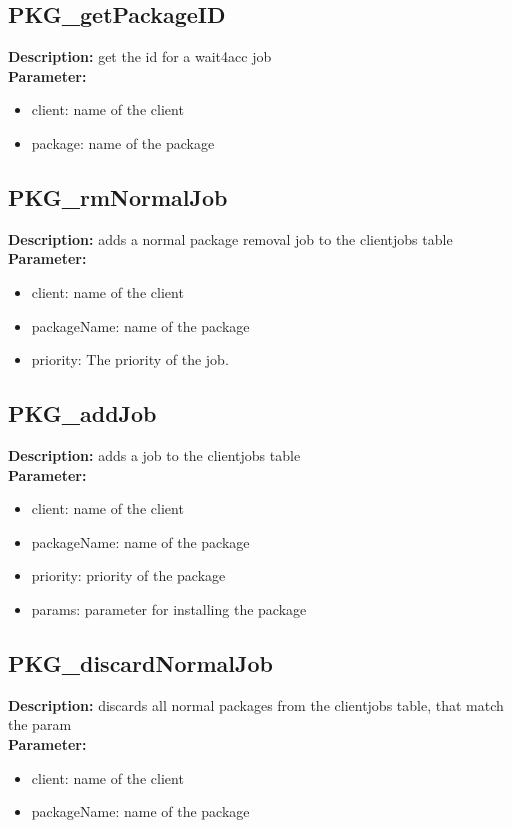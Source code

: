 \subsection{PKG\_getPackageID}
\textbf{Description:} get the id for a wait4acc job\\
\textbf{Parameter:}
\begin{itemize}
\item client: name of the client
\item package: name of the package
\end{itemize}

\subsection{PKG\_rmNormalJob}
\textbf{Description:} adds a normal package removal job to the clientjobs table\\
\textbf{Parameter:}
\begin{itemize}
\item client: name of the client
\item packageName: name of the package
\item priority: The priority of the job.
\end{itemize}

\subsection{PKG\_addJob}
\textbf{Description:} adds a job to the clientjobs table\\
\textbf{Parameter:}
\begin{itemize}
\item client: name of the client
\item packageName: name of the package
\item priority: priority of the package
\item params: parameter for installing the package
\end{itemize}

\subsection{PKG\_discardNormalJob}
\textbf{Description:} discards all normal packages from the clientjobs table, that match the param\\
\textbf{Parameter:}
\begin{itemize}
\item client: name of the client
\item packageName: name of the package
\end{itemize}

